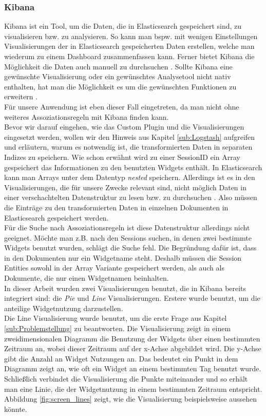 \subsubsection{Kibana}
\label{ssub:Kibana}
Kibana ist ein Tool, um die Daten, die in Elasticsearch gespeichert sind, zu visualisieren bzw. zu analysieren. So kann man bspw. mit wenigen Einstellungen Visualisierungen der in Elasticsearch gespeicherten Daten erstellen, welche man wiederum zu einem Dash\-board zusammenfassen kann. Ferner bietet Kibana die Möglichkeit die Daten auch manuell zu durchsuchen \citep{Ho16}. Sollte Kibana eine gewünschte Visualisierung oder ein gewünschtes Analysetool nicht nativ enthalten, hat man die Möglichkeit es um die gewünschten Funktionen zu erweitern \citep{KibPlug20}.\\
Für unsere Anwendung ist eben dieser Fall eingetreten, da man nicht ohne weiteres Assoziationsregeln mit Kibana finden kann.\\
Bevor wir darauf eingehen, wie das Custom Plugin und die Visualisierungen eingesetzt werden, wollen wir den Hinweis aus Kapitel \ref{sub:Logstash} aufgreifen und erläutern, warum es notwendig ist, die transformierten Daten in separaten Indizes zu speichern. Wie schon erwähnt wird zu einer SessionID ein Array gespeichert das Informationen zu den benutzten Widgets enthält. In Elasticsearch kann man Arrays unter dem Datentyp \textit{nested} speichern. Allerdings ist es in den Visualisierungen, die für unsere Zwecke relevant sind, nicht möglich Daten in einer verschachtelten Datenstruktur zu lesen bzw. zu durchsuchen \citep{KibForum20}. Also müssen die Einträge zu den transformierten Daten in einzelnen Dokumenten in Elasticsearch gespeichert werden.\\
Für die Suche nach Assoziationsregeln ist diese Datenstruktur allerdings nicht geeignet. Möchte man z.B. nach den Sessions suchen, in denen zwei bestimmte Widgets benutzt wurden, schlägt die Suche fehl. Die Begründung dafür ist, dass in den Dokumenten nur ein Widgetname steht. Deshalb müssen die Session Entities sowohl in der Array Variante gespeichert werden, als auch als Dokumente, die nur einen Widgetnamen beinhalten.
\\
In dieser Arbeit wurden zwei Visualisierungen benutzt, die in Kibana bereits integriert sind: die \textit{Pie} und \textit{Line} Visualisierungen. Erstere wurde benutzt, um die anteilige Widgetnutzung darzustellen.\\
Die Line Visualisierung wurde benutzt, um die erste Frage aus Kapitel \ref{sub:Problemstellung} zu beantworten. Die Visualisierung zeigt in einem zweidimensionalen Diagramm die Benutzung der Widgets über einen bestimmten Zeitraum an, wobei dieser Zeitraum auf der x-Achse abgebildet wird. Die y-Achse gibt die Anzahl an Widget Nutzungen an. Das bedeutet ein Punkt in dem Diagramm zeigt an, wie oft ein Widget an einem bestimmten Tag benutzt wurde. Schließlich verbindet die Visualisierung die Punkte miteinander und so erhält man eine Linie, die der Widgetnutzung in einem bestimmten Zeitraum entspricht. Abbildung \ref{fig:screen_lines} zeigt, wie die Visualisierung beispielsweise aussehen könnte.

